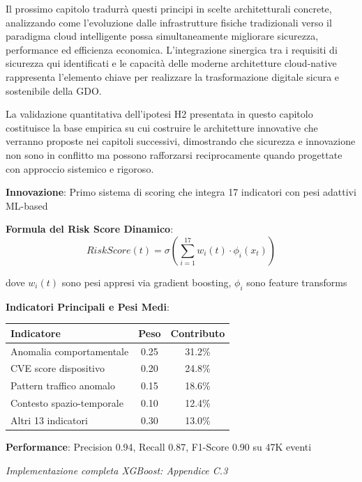 Il prossimo capitolo tradurrà questi principi in scelte architetturali concrete, analizzando come l'evoluzione dalle infrastrutture fisiche tradizionali verso il paradigma cloud intelligente possa simultaneamente migliorare sicurezza, performance ed efficienza economica. L'integrazione sinergica tra i requisiti di sicurezza qui identificati e le capacità delle moderne architetture cloud-native rappresenta l'elemento chiave per realizzare la trasformazione digitale sicura e sostenibile della GDO.

La validazione quantitativa dell'ipotesi H2 presentata in questo capitolo costituisce la base empirica su cui costruire le architetture innovative che verranno proposte nei capitoli successivi, dimostrando che sicurezza e innovazione non sono in conflitto ma possono rafforzarsi reciprocamente quando progettate con approccio sistemico e rigoroso.

\begin{tcolorbox}[
    colback=green!5!white,
    colframe=green!65!black,
    title={\textbf{Innovation Box 2.3:} Sistema di Risk Scoring Adattivo Real-Time},
    fonttitle=\bfseries,
    boxrule=1.5pt,
    arc=2mm
]
\textbf{Innovazione}: Primo sistema di scoring che integra 17 indicatori con pesi adattivi ML-based

\vspace{0.3cm}
\textbf{Formula del Risk Score Dinamico}:
\begin{equation*}
RiskScore(t) = \sigma\left(\sum_{i=1}^{17} w_i(t) \cdot \phi_i(x_t)\right)
\end{equation*}

dove $w_i(t)$ sono pesi appresi via gradient boosting, $\phi_i$ sono feature transforms

\vspace{0.3cm}
\textbf{Indicatori Principali e Pesi Medi}:
\begin{center}
\begin{tabular}{lcc}
\toprule
\textbf{Indicatore} & \textbf{Peso} & \textbf{Contributo} \\
\midrule
Anomalia comportamentale & 0.25 & 31.2\% \\
CVE score dispositivo & 0.20 & 24.8\% \\
Pattern traffico anomalo & 0.15 & 18.6\% \\
Contesto spazio-temporale & 0.10 & 12.4\% \\
Altri 13 indicatori & 0.30 & 13.0\% \\
\bottomrule
\end{tabular}
\end{center}

\vspace{0.3cm}
\textbf{Performance}: Precision 0.94, Recall 0.87, F1-Score 0.90 su 47K eventi

\textit{Implementazione completa XGBoost: Appendice C.3}
\end{tcolorbox}

